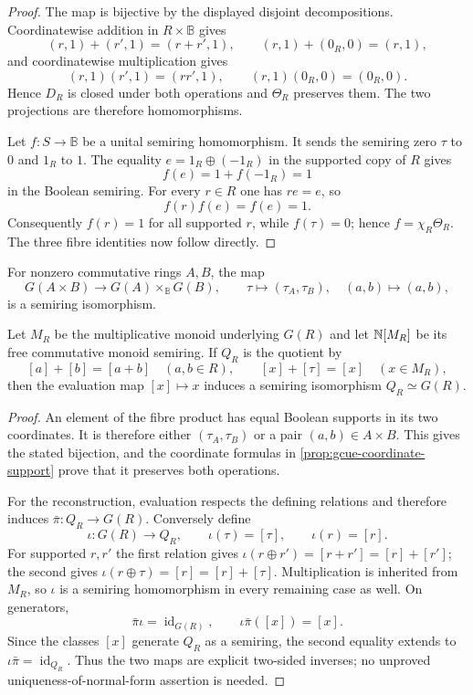 \begin{proof}
The map is bijective by the displayed disjoint decompositions.  Coordinatewise addition in
$R\times\mathbb B$ gives
\[
 (r,1)+(r',1)=(r+r',1),\qquad (r,1)+(0_R,0)=(r,1),
\]
and coordinatewise multiplication gives
\[
 (r,1)(r',1)=(rr',1),\qquad (r,1)(0_R,0)=(0_R,0).
\]
Hence $D_R$ is closed under both operations and $\Theta_R$ preserves them.  The two
projections are therefore homomorphisms.

Let $f:S\to\mathbb B$ be a unital semiring homomorphism.  It sends the semiring zero
$\tau$ to $0$ and $1_R$ to $1$.  The equality $e=1_R\oplus(-1_R)$ in the supported copy
of $R$ gives
\[
 f(e)=1+f(-1_R)=1
\]
in the Boolean semiring.  For every $r\in R$ one has $re=e$, so
\[
 f(r)f(e)=f(e)=1.
\]
Consequently $f(r)=1$ for all supported $r$, while $f(\tau)=0$; hence
$f=\chi_R\Theta_R$.  The three fibre identities now follow directly.
\end{proof}

\begin{proposition}
\label{prop:gcue-product-reconstruction}
For nonzero commutative rings $A,B$, the map
\[
 G(A\times B)\longrightarrow G(A)\times_{\mathbb B}G(B),
 \qquad
 \tau\longmapsto(\tau_A,\tau_B),\quad (a,b)\longmapsto(a,b),
\]
is a semiring isomorphism.

Let $M_R$ be the multiplicative monoid underlying $G(R)$ and let $\mathbb{N}[M_R]$ be its free
commutative monoid semiring.  If $Q_R$ is the quotient by
\[
 [a]+[b]=[a+b]\quad(a,b\in R),
 \qquad
 [x]+[\tau]=[x]\quad(x\in M_R),
\]
then the evaluation map $[x]\mapsto x$ induces a semiring isomorphism
$Q_R\simeq G(R)$.
\end{proposition}

\begin{proof}
An element of the fibre product has equal Boolean supports in its two coordinates.  It is
therefore either $(\tau_A,\tau_B)$ or a pair $(a,b)\in A\times B$.  This gives the stated
bijection, and the coordinate formulas in \cref{prop:gcue-coordinate-support} prove that it
preserves both operations.

For the reconstruction, evaluation respects the defining relations and therefore induces
$\bar\pi:Q_R\to G(R)$.  Conversely define
\[
 \iota:G(R)\longrightarrow Q_R,
 \qquad \iota(\tau)=[\tau],\qquad \iota(r)=[r].
\]
For supported $r,r'$ the first relation gives
$\iota(r\oplus r')=[r+r']=[r]+[r']$; the second gives
$\iota(r\oplus\tau)=[r]=[r]+[\tau]$.  Multiplication is inherited from $M_R$, so $\iota$
is a semiring homomorphism in every remaining case as well.  On generators,
\[
 \bar\pi\iota=\operatorname{id}_{G(R)},\qquad
 \iota\bar\pi([x])=[x].
\]
Since the classes $[x]$ generate $Q_R$ as a semiring, the second equality extends to
$\iota\bar\pi=\operatorname{id}_{Q_R}$.  Thus the two maps are explicit two-sided inverses;
no unproved uniqueness-of-normal-form assertion is needed.
\end{proof}


